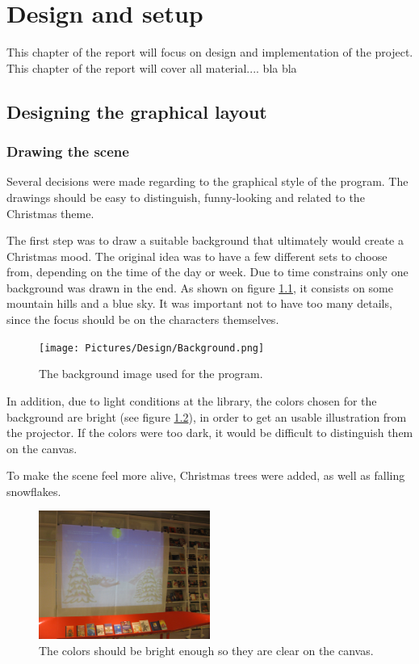 \chapter{Design and setup}\label{implementation}
This chapter of the report will focus on design and implementation of the project. This chapter of the report will cover all material.... bla bla

\section{Designing the graphical layout}
\subsection{Drawing the scene}
Several decisions were made regarding to the graphical style of the program. The drawings should be easy to distinguish, funny-looking and related to the Christmas theme. 

The first step was to draw a suitable background that ultimately would create a Christmas mood. The original idea was to have a few different sets to choose from, depending on the time of the day or week. Due to time constrains only one background was drawn in the end. As shown on figure \ref{fig:ip_Background}, it consists on some mountain hills and a blue sky. It was important not to have too many details, since the focus should be on the characters themselves.

\begin{figure}[htbp]
\centering
\texttt{[image: Pictures/Design/Background.png]}
\caption{The background image used for the program.}
\label{fig:ip_Background}
\end{figure}

In addition, due to light conditions at the library, the colors chosen for the background are bright (see figure \ref{fig:background_projector}), in order to get an usable illustration from the projector. If the colors were too dark, it would be difficult to distinguish them on the canvas.

To make the scene feel more alive, Christmas trees were added, as well as falling snowflakes.

\begin{figure}[htbp]
\centering
\includegraphics[width=0.50\textwidth]{Pictures/Design/background_projector}
\caption{The colors should be bright enough so they are clear on the canvas.}
\label{fig:background_projector}
\end{figure}

